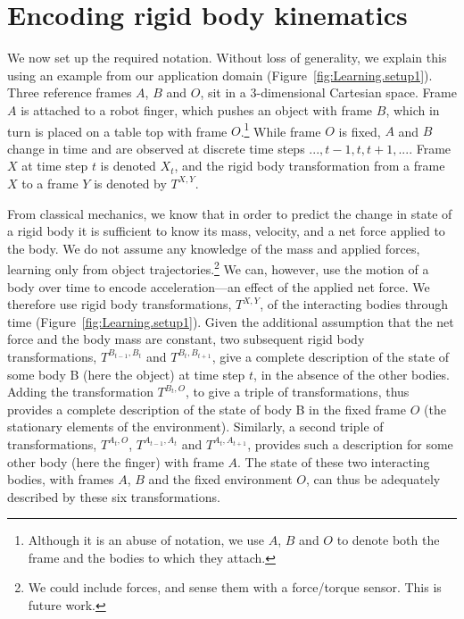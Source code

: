 \section{Encoding rigid body kinematics}
\label{sec:Representations}

We now set up the required notation. Without loss of generality, we explain this using an example from our application domain
(Figure~\ref{fig:Learning.setup1}). Three reference frames $A$, $B$
and $O$, sit in a $3$\nobreakdash-\hspace{0pt}dimensional Cartesian
space. Frame $A$ is attached to a robot finger, which pushes an object with frame $B$, which in turn is placed on a table top with frame
$O$.\footnote{Although it is an abuse of notation, we
  use $A$, $B$ and $O$ to denote both the frame and the bodies to which they attach.} While frame $O$ is fixed, $A$ and $B$ change in time and are observed at discrete time steps $..., t-1, t, t+1, ...$.  Frame $X$ at
time step $t$ is denoted $X_t$, and the rigid body transformation
from a frame $X$ to a frame $Y$ is denoted by $T^{X, Y}$.

From classical mechanics, we know that in order to predict the change
in state of a rigid body it is sufficient to know its mass, velocity,
and a net force applied to the body.  We do not assume any knowledge of
the mass and applied forces, learning only from object trajectories.\footnote{We could include forces, and sense them with a force/torque sensor. This is future work.} We can, however, use the motion of a body over time to encode acceleration---an effect of the applied net
force. We therefore use rigid body transformations, $T^{X,Y}$, of the interacting bodies through time (Figure~\ref{fig:Learning.setup1}). Given the additional assumption that the net force and the body mass are constant, two subsequent rigid body transformations, $T^{B_{t-1},
  B_{t}}$ and $T^{B_{t},B_{t+1}}$, give a complete description of the
state of some body B (here the object) at time step $t$, in the absence
of the other bodies.  Adding the transformation $T^{B_t, O}$, to give a
triple of transformations, thus provides a complete description of the
state of body B in the fixed frame $O$ (the stationary elements of the
environment).  Similarly, a second triple of transformations, $T^{A_t,
  O}$, $T^{A_{t-1}, A_{t}}$ and $T^{A_{t}, A_{t+1}}$, provides such a
description for some other body (here the finger) with frame $A$. 
The state of these two interacting bodies, with frames $A$, $B$ and the fixed environment $O$, can thus be adequately described by these six transformations.

